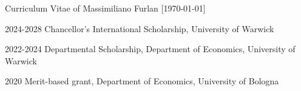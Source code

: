 \documentclass[11pt,a4paper]{article}
\begin{document}
\begin{cv}{\LARGE Curriculum Vitae of Massimiliano Furlan \large{[\mydatestyle\today]}}
\begin{cvlist}{}
	\item[2024-2028] Chancellor's International Scholarship, University of Warwick 
	\item[2022-2024] Departmental Scholarship, Department of Economics, University of Warwick 
	\item[2020] Merit-based grant, Department of Economics, University of Bologna
\end{cvlist}




\end{cv}
\end{document}
